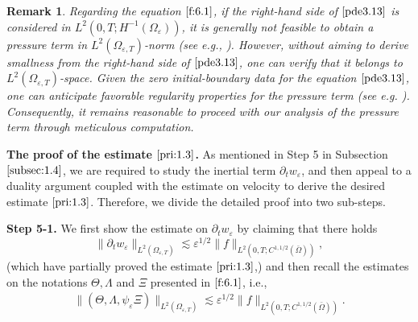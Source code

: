\documentclass[13pt,CJK]{article}
\theoremstyle{plain}                       %
\newtheorem{remark}[lemma]{Remark}
\theoremstyle{remark}
\numberwithin{equation}{section}
\begin{document}
\begin{remark}\label{remark:6.1}
\emph{Regarding the equation $\eqref{f:6.1}$,
if the right-hand side of $\eqref{pde3.13}$ is
considered in $L^2(0,T;H^{-1}(\Omega_\varepsilon))$,
it is generally not feasible to obtain a pressure term
in $L^2(\Omega_{\varepsilon,T})$-norm
(see e.g., \cite[Proposition 5]{Simon99}).
However, without aiming to derive smallness from
the right-hand side of $\eqref{pde3.13}$,
one can verify that it belongs to 
$L^2(\Omega_{\varepsilon,T})$-space.
Given the zero initial-boundary data for the equation $\eqref{pde3.13}$,
one can anticipate favorable regularity properties for the pressure term
(see e.g. \cite[Theorem 1]{Wolf18}).
Consequently, it remains reasonable to proceed with our analysis
of the pressure term through meticulous computation.}
\end{remark}


\noindent
\textbf{The proof of the estimate $\eqref{pri:1.3}$.}
As mentioned in Step 5 in Subsection $\ref{subsec:1.4}$, we are required to study the inertial term $\partial_t w_\varepsilon$, and then appeal to a duality argument coupled with the estimate on velocity to derive the desired estimate $\eqref{pri:1.3}$. Therefore, we divide the detailed proof
into two sub-steps.

\medskip

\textbf{Step 5-1.}  We first show the estimate on $\partial_t w_\varepsilon$ by claiming that there holds
\begin{equation}\label{f:6.2}
   \|\partial_t w_\varepsilon\|_{L^2(\Omega_{\varepsilon,T})}
   \lesssim \varepsilon^{1/2}\|f\|_{L^2(0,T;C^{1,1/2}(\bar\Omega))},
\end{equation}
(which have partially proved the estimate $\eqref{pri:1.3}$,) and then recall the estimates on the notations $\Theta, \Lambda$ and $\Xi$
presented in $\eqref{f:6.1}$, i.e.,
\begin{equation}\label{f:6.3}
\begin{aligned}
\|(\Theta,\Lambda,\psi_{\varepsilon}\Xi)\|_{L^2(\Omega_{\varepsilon,T})}
\lesssim \varepsilon^{1/2}\|f\|_{L^2(0,T;C^{1,1/2}(\bar\Omega))}.
\end{aligned}
\end{equation}

\medskip
\end{document}
